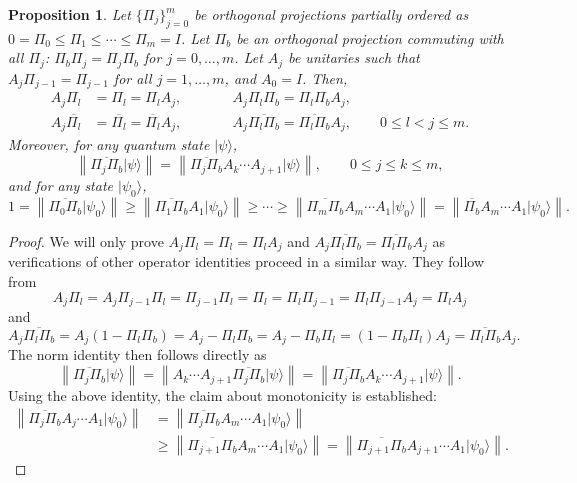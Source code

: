 \documentclass[letterpaper,onecolumn,11pt,accepted=2026-02-14]{quantumarticle}
\newcommand{\norm}[1]{\left\lVert#1\right\rVert}
\newtheorem{proposition}[lemma]{Proposition}
\theoremstyle{remark}
\theoremstyle{plain}
\newcommand{\ket}[1]{|#1\rangle}
\begin{document}
\begin{proposition}
Let $\{\Pi_j\}_{j=0}^m$ be orthogonal projections partially ordered as  $0=\Pi_0\leq\Pi_1\leq\cdots\leq\Pi_m=I$.
Let $\Pi_b$ be an orthogonal projection commuting with all $\Pi_j$: $\Pi_b\Pi_j=\Pi_j\Pi_b$ for $j=0,\ldots, m$.
Let $A_j$ be unitaries such that $A_j\Pi_{j-1}=\Pi_{j-1}$ for all $j=1,\ldots, m$, and $A_0=I$. Then,
\begin{equation}
\begin{aligned}
    A_j\Pi_l&=\Pi_l=\Pi_lA_j,\qquad &&A_j\Pi_l\Pi_b=\Pi_l\Pi_bA_j,\\
    A_j\overline{\Pi_l}&=\overline{\Pi_l}=\overline{\Pi_l}A_j,
    &&A_j\overline{\Pi_l\Pi_b}=\overline{\Pi_l\Pi_b}A_j,\qquad
    0\leq l<j\leq m.
\end{aligned}
\end{equation}
Moreover, for any quantum state $\ket{\psi}$,
\begin{equation}
    \norm{\overline{\Pi_{j}\Pi_b}\ket{\psi}}=\norm{\overline{\Pi_{j}\Pi_b}A_{k}\cdots A_{j+1}\ket{\psi}},\qquad
    0\leq j\leq k\leq m,
\end{equation}
and for any state $\ket{\psi_0}$,
\begin{equation}
    1=\norm{\overline{\Pi_{0}\Pi_b}\ket{\psi_0}}\geq\norm{\overline{\Pi_{1}\Pi_b}A_1\ket{\psi_0}}\geq\cdots\geq\norm{\overline{\Pi_{m}\Pi_b}A_{m}\cdots A_1\ket{\psi_0}}=\norm{\overline{\Pi_b}A_{m}\cdots A_1\ket{\psi_0}}.
\end{equation}
\end{proposition}
\begin{proof}
We will only prove $A_j\Pi_l=\Pi_l=\Pi_lA_j$ and $A_j\overline{\Pi_l\Pi_b}=\overline{\Pi_l\Pi_b}A_j$ as verifications of other operator identities proceed in a similar way. They follow from
\begin{equation}
    A_j\Pi_l=A_j\Pi_{j-1}\Pi_l=\Pi_{j-1}\Pi_l
    =\Pi_l=\Pi_l\Pi_{j-1}=\Pi_l\Pi_{j-1}A_j=\Pi_lA_j
\end{equation}
and 
\begin{equation}
    A_j\overline{\Pi_l\Pi_b}=A_j(1-\Pi_l\Pi_b)
    =A_j-\Pi_l\Pi_b=A_j-\Pi_b\Pi_l
    =(1-\Pi_b\Pi_l)A_j=\overline{\Pi_l\Pi_b}A_j.
\end{equation}
The norm identity then follows directly as
\begin{equation}
    \norm{\overline{\Pi_{j}\Pi_b}\ket{\psi}}
    =\norm{A_{k}\cdots A_{j+1}\overline{\Pi_{j}\Pi_b}\ket{\psi}}
    =\norm{\overline{\Pi_{j}\Pi_b}A_{k}\cdots A_{j+1}\ket{\psi}}.
\end{equation}
Using the above identity, the claim about monotonicity is established:
    \begin{equation}
    \begin{aligned}
        \norm{\overline{\Pi_{j}\Pi_b}A_{j}\cdots A_1\ket{\psi_0}}
        &=\norm{\overline{\Pi_{j}\Pi_b}A_{m}\cdots A_1\ket{\psi_0}}\\
        &\geq\norm{\overline{\Pi_{j+1}\Pi_b}A_{m}\cdots A_1\ket{\psi_0}}
        =\norm{\overline{\Pi_{j+1}\Pi_b}A_{j+1}\cdots A_1\ket{\psi_0}}.
    \end{aligned}
    \end{equation}
\end{proof}
\end{document}
